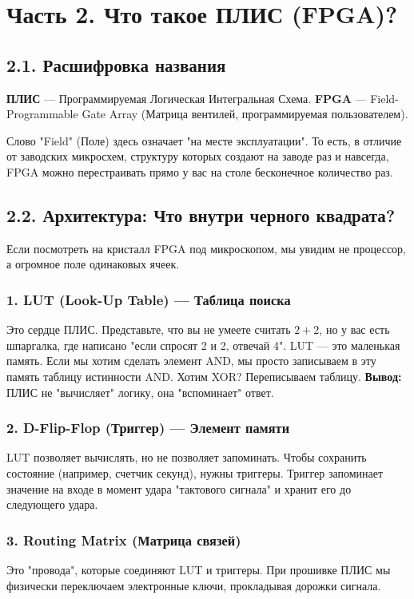 \documentclass[12pt, a4paper]{article}
\begin{document}
\newpage

\section{Часть 2. Что такое ПЛИС (FPGA)?}

\subsection{2.1. Расшифровка названия}
\textbf{ПЛИС} — Программируемая Логическая Интегральная Схема.
\textbf{FPGA} — Field-Programmable Gate Array (Матрица вентилей, программируемая пользователем).

Слово "Field" (Поле) здесь означает "на месте эксплуатации". То есть, в отличие от заводских микросхем, структуру которых создают на заводе раз и навсегда, FPGA можно перестраивать прямо у вас на столе бесконечное количество раз.

\subsection{2.2. Архитектура: Что внутри черного квадрата?}
Если посмотреть на кристалл FPGA под микроскопом, мы увидим не процессор, а огромное поле одинаковых ячеек.

\subsubsection{1. LUT (Look-Up Table) — Таблица поиска}
Это сердце ПЛИС. Представьте, что вы не умеете считать $2+2$, но у вас есть шпаргалка, где написано "если спросят 2 и 2, отвечай 4". 
LUT — это маленькая память. Если мы хотим сделать элемент AND, мы просто записываем в эту память таблицу истинности AND. Хотим XOR? Переписываем таблицу.
\textbf{Вывод:} ПЛИС не "вычисляет" логику, она "вспоминает" ответ.

\subsubsection{2. D-Flip-Flop (Триггер) — Элемент памяти}
LUT позволяет вычислять, но не позволяет запоминать. Чтобы сохранить состояние (например, счетчик секунд), нужны триггеры.
Триггер запоминает значение на входе в момент удара "тактового сигнала" и хранит его до следующего удара.

\subsubsection{3. Routing Matrix (Матрица связей)}
Это "провода", которые соединяют LUT и триггеры. При прошивке ПЛИС мы физически переключаем электронные ключи, прокладывая дорожки сигнала.
\end{document}
